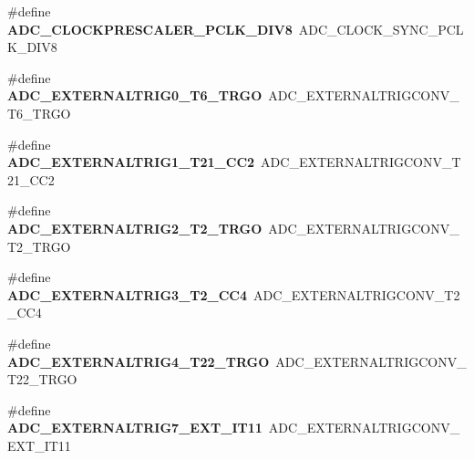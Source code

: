 \begin{DoxyCompactItemize}
\#define {\bfseries A\+D\+C\+\_\+\+C\+L\+O\+C\+K\+P\+R\+E\+S\+C\+A\+L\+E\+R\+\_\+\+P\+C\+L\+K\+\_\+\+D\+I\+V8}~A\+D\+C\+\_\+\+C\+L\+O\+C\+K\+\_\+\+S\+Y\+N\+C\+\_\+\+P\+C\+L\+K\+\_\+\+D\+I\+V8
\item 
\mbox{\label{group___h_a_l___a_d_c___aliased___defines_ga72d7fcd1d65274786de2b3ccd6b853c4}} 
\#define {\bfseries A\+D\+C\+\_\+\+E\+X\+T\+E\+R\+N\+A\+L\+T\+R\+I\+G0\+\_\+\+T6\+\_\+\+T\+R\+GO}~A\+D\+C\+\_\+\+E\+X\+T\+E\+R\+N\+A\+L\+T\+R\+I\+G\+C\+O\+N\+V\+\_\+\+T6\+\_\+\+T\+R\+GO
\item 
\mbox{\label{group___h_a_l___a_d_c___aliased___defines_gab001be8f7abe45ddf92a476a65c6dd50}} 
\#define {\bfseries A\+D\+C\+\_\+\+E\+X\+T\+E\+R\+N\+A\+L\+T\+R\+I\+G1\+\_\+\+T21\+\_\+\+C\+C2}~A\+D\+C\+\_\+\+E\+X\+T\+E\+R\+N\+A\+L\+T\+R\+I\+G\+C\+O\+N\+V\+\_\+\+T21\+\_\+\+C\+C2
\item 
\mbox{\label{group___h_a_l___a_d_c___aliased___defines_gaad24eb6d74f2e4396d59afc4c715a053}} 
\#define {\bfseries A\+D\+C\+\_\+\+E\+X\+T\+E\+R\+N\+A\+L\+T\+R\+I\+G2\+\_\+\+T2\+\_\+\+T\+R\+GO}~A\+D\+C\+\_\+\+E\+X\+T\+E\+R\+N\+A\+L\+T\+R\+I\+G\+C\+O\+N\+V\+\_\+\+T2\+\_\+\+T\+R\+GO
\item 
\mbox{\label{group___h_a_l___a_d_c___aliased___defines_gaa0f8054b3363d13a190ee0d366363575}} 
\#define {\bfseries A\+D\+C\+\_\+\+E\+X\+T\+E\+R\+N\+A\+L\+T\+R\+I\+G3\+\_\+\+T2\+\_\+\+C\+C4}~A\+D\+C\+\_\+\+E\+X\+T\+E\+R\+N\+A\+L\+T\+R\+I\+G\+C\+O\+N\+V\+\_\+\+T2\+\_\+\+C\+C4
\item 
\mbox{\label{group___h_a_l___a_d_c___aliased___defines_ga671cb20b99d24f3c9923ac7777e5f84e}} 
\#define {\bfseries A\+D\+C\+\_\+\+E\+X\+T\+E\+R\+N\+A\+L\+T\+R\+I\+G4\+\_\+\+T22\+\_\+\+T\+R\+GO}~A\+D\+C\+\_\+\+E\+X\+T\+E\+R\+N\+A\+L\+T\+R\+I\+G\+C\+O\+N\+V\+\_\+\+T22\+\_\+\+T\+R\+GO
\item 
\mbox{\label{group___h_a_l___a_d_c___aliased___defines_ga54407c5dc446f7d5425d8ac135bee69e}} 
\#define {\bfseries A\+D\+C\+\_\+\+E\+X\+T\+E\+R\+N\+A\+L\+T\+R\+I\+G7\+\_\+\+E\+X\+T\+\_\+\+I\+T11}~A\+D\+C\+\_\+\+E\+X\+T\+E\+R\+N\+A\+L\+T\+R\+I\+G\+C\+O\+N\+V\+\_\+\+E\+X\+T\+\_\+\+I\+T11

\end{DoxyCompactItemize}
